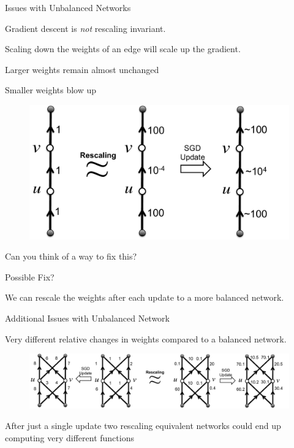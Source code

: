 \documentclass[presentation,xcolor={usenames,dvipsnames},10pt]{beamer}
\begin{document}
\begin{frame}{Issues with Unbalanced Networks}

\bit
\item Gradient descent is \emph{not} rescaling invariant. 
\item Scaling down the weights of an edge will scale up the gradient. 
\item Larger weights remain almost unchanged 
\item Smaller weights blow up

\begin{figure}
	\includegraphics[scale=0.3]{pic3.pdf}
\end{figure}

\item Can you think of a way to fix this?

\eit
\end{frame}


\begin{frame}{Possible Fix?}
\bit 
\item We can rescale the weights after each update to a more balanced network.
\eit 
\end{frame} 

\begin{frame}{Additional Issues with Unbalanced Network}
\bit 
\item Very different relative changes in weights compared to a balanced network. 

\begin{figure}
	\includegraphics[scale=0.24]{pic4.pdf}
\end{figure}
\item After just a single update two rescaling equivalent networks could end up computing very different functions
\eit
\end{frame}
\end{document}
